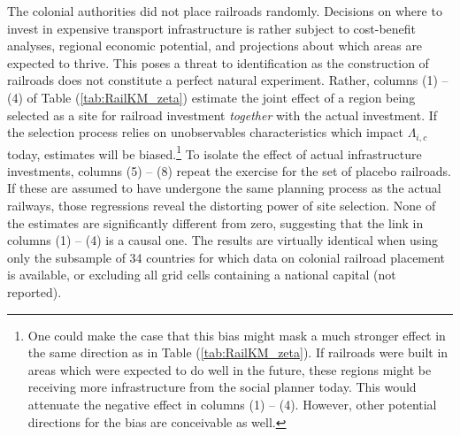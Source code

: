 \documentclass[11pt, oneside]{article}   	%
\let\oldref\ref
\renewcommand{\ref}[1]{(\oldref{#1})}
\begin{document}
The colonial authorities did not place railroads randomly. Decisions on where to invest in expensive transport infrastructure is rather subject to cost-benefit analyses, regional economic potential, and projections about which areas are expected to thrive. This poses a threat to identification as the construction of railroads does not constitute a perfect natural experiment. Rather, columns (1) -- (4) of Table \ref{tab:RailKM_zeta} estimate the joint effect of a region being selected as a site for railroad investment \emph{together} with the actual investment. If the selection process relies on unobservables characteristics which impact $\Lambda_{i,c}$ today, estimates will be biased.\footnote{One could make the case that this bias might mask a much stronger effect in the same direction as in Table \ref{tab:RailKM_zeta}. If railroads were built in areas which were expected to do well in the future, these regions might be receiving more infrastructure from the social planner today. This would attenuate the negative effect in columns (1) -- (4). However, other potential directions for the bias are conceivable as well.} To isolate the effect of actual infrastructure investments, columns (5) -- (8) repeat the exercise for the set of placebo railroads. If these are assumed to have undergone the same planning process as the actual railways, those regressions reveal the distorting power of site selection. None of the estimates are significantly different from zero, suggesting that the link in columns (1) -- (4) is a causal one. The results are virtually identical when using only the subsample of 34 countries for which data on colonial railroad placement is available, or excluding all grid cells containing a national capital (not reported).
\end{document}
